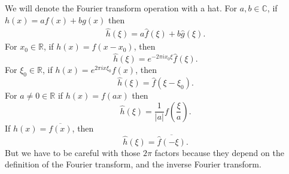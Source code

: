 \begin{questions}
\begin{solution}
We will denote the Fourier transform operation  with a hat. For $a,b\in \mathbb{C}$, if $h(x) = af(x) + bg(x)$ then
\begin{eqnarray}
  \hat{h}(\xi) = a\hat{f}(\xi) +b\hat{g}(\xi).
\end{eqnarray}
For $x_0\in \mathbb{R}$, if $h(x)=f(x-x_0)$, then
\begin{equation}
  \hat{h}(\xi) = e^{-2\pi ix_0\xi}\hat{f}(\xi).
\end{equation}
For $\xi_0\in \mathbb{R}$, if $h(x)=e^{2\pi ix\xi_0}f(x)$, then
\begin{equation}
  \hat{h}(\xi) = \hat{f}(\xi - \xi_0).
\end{equation}
For $a\neq 0 \in \mathbb{R}$ if $h(x) = f(ax)$ then
\begin{equation}
  \hat{h}(\xi) = \frac{1}{|a|}f\left(\frac{\xi}{a}\right).
\end{equation}
If $h(x) = \overline{f(x)}$, then
\begin{equation}
  \hat{h}(\xi) = \overline{\hat{f}(-\xi)}.
\end{equation}
But we have to be careful with those $2\pi$ factors because they depend on the definition of the Fourier transform, and the inverse Fourier transform.
\end{solution}

\end{questions}

%
%
